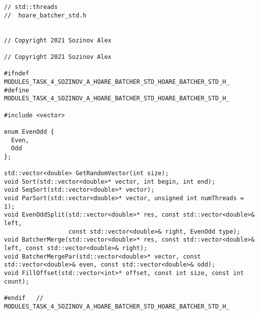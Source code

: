 \documentclass{report}
\begin{document}
\begin{lstlisting}
// std::threads
//  hoare_batcher_std.h


// Copyright 2021 Sozinov Alex

// Copyright 2021 Sozinov Alex

#ifndef MODULES_TASK_4_SOZINOV_A_HOARE_BATCHER_STD_HOARE_BATCHER_STD_H_
#define MODULES_TASK_4_SOZINOV_A_HOARE_BATCHER_STD_HOARE_BATCHER_STD_H_

#include <vector>

enum EvenOdd {
  Even,
  Odd
};

std::vector<double> GetRandomVector(int size);
void Sort(std::vector<double>* vector, int begin, int end);
void SeqSort(std::vector<double>* vector);
void ParSort(std::vector<double>* vector, unsigned int numThreads = 1);
void EvenOddSplit(std::vector<double>* res, const std::vector<double>& left,
                  const std::vector<double>& right, EvenOdd type);
void BatcherMerge(std::vector<double>* res, const std::vector<double>& left, const std::vector<double>& right);
void BatcherMergePar(std::vector<double>* vector, const std::vector<double>& even, const std::vector<double>& odd);
void FillOffset(std::vector<int>* offset, const int size, const int count);

#endif   // MODULES_TASK_4_SOZINOV_A_HOARE_BATCHER_STD_HOARE_BATCHER_STD_H_

\end{lstlisting}
\end{document}
